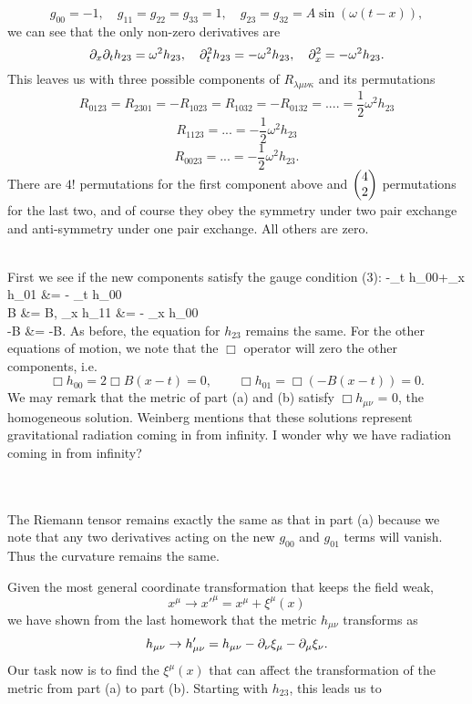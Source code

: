 \documentclass[10pt,letterpaper]{article}
\begin{document}
\[
	g_{00} = -1,\quad g_{11} = g_{22} = g_{33} = 1,\quad g_{23} = g_{32} = A\sin(\omega(t-x)),
\] 
we can see that the only non-zero derivatives are
\[
	\partial_x\partial_t h_{23} = \omega^2h_{23},\quad \partial_t^2 h_{23} = -\omega^2 h_{23},\quad \partial_x^2 = -\omega^2 h_{23}.
\]
This leaves us with three possible components of $R_{\lambda\mu\nu\kappa}$ and its permutations
\[
	R_{0123} = R_{2301} = -R_{1023} = R_{1032} = -R_{0132} = .... = \frac12 \omega^2 h_{23}
\]
\[
	R_{1123} = ... = -\frac12 \omega^2 h_{23}
\]
\[
	R_{0023} = ... = -\frac12 \omega^2 h_{23}.
\]
There are $4!$ permutations for the first component above and $\begin{pmatrix} 4\\2 \end{pmatrix}$ permutations for the last two, and of course they obey the symmetry under two pair exchange and anti-symmetry under one pair exchange. All others are zero. 
\\  \\
\item
First we see if the new components satisfy the gauge condition (3):
\ba
	-\pd_t h_{00}+\pd_x h_{01} &= - \pd_t h_{00} \\
	B &= B,
\ea
\ba
	\pd_x h_{11} &= - \pd_x h_{00} \\
	-B &= -B.
\ea
As before, the equation for $h_{23}$ remains the same. For the other equations of motion, we note that the $\Box$ operator will zero the other components, i.e.
\[
	\Box h_{00} = 2\Box B(x-t) = 0,\qquad \Box h_{01} = \Box (-B(x-t)) = 0.
\]
We may remark that the metric of part (a) and (b) satisfy $\Box h_{\mu\nu}$ = 0, the homogeneous solution. Weinberg mentions that these solutions represent gravitational radiation coming in from infinity. I wonder why we have radiation coming in from infinity? 
\\ \\ \\
\item
The Riemann tensor remains exactly the same as that in part (a) because we note that any two derivatives acting on the new $g_{00}$ and $g_{01}$ terms will vanish. Thus the curvature remains the same. 
\\ 
\item
Given the most general coordinate transformation that keeps the field weak,
\[
	x^\mu \to x'^\mu = x^\mu + \xi^\mu(x)
\]
we have shown from the last homework that the metric $h_{\mu\nu}$ transforms as
\[
	h_{\mu\nu} \to h'_{\mu\nu} = h_{\mu\nu} -\partial_\nu \xi_\mu - \partial_\mu\xi_\nu.
\]
Our task now is to find the $\xi^\mu(x)$ that can affect the transformation of the metric from part (a) to part (b). Starting with $h_{23}$, this leads us to
\end{document}
